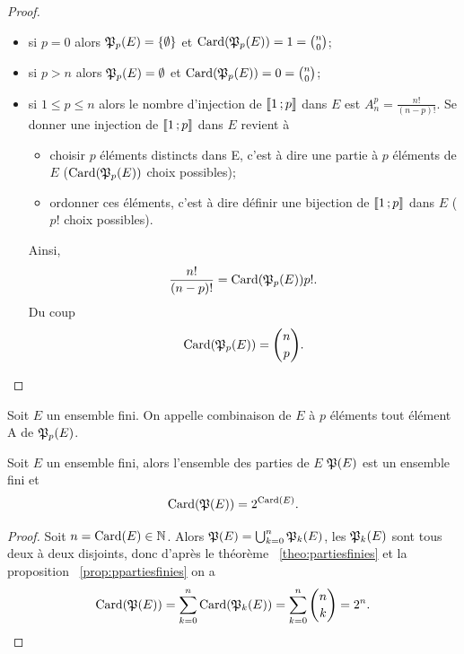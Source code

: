 \begin{proof}
  \begin{itemize}
    \item si \(p = 0\) alors \(\mathfrak{P}_p(E) = \{\emptyset\}\) et 
      \(\operatorname{Card}(\mathfrak{P}_p(E)) = 1 = \binom{n}{0}\);
    \item si \(p>n\) alors \(\mathfrak{P}_p(E)=\emptyset\) et 
      \(\operatorname{Card}(\mathfrak{P}_p(E)) = 0 = \binom{n}{0}\);
    \item si \(1\leqslant p \leqslant n\) alors le nombre d'injection de 
      \(\mathopen{\llbracket}1\mathclose{}\mathpunct{};p\mathclose{\rrbracket}\) dans \(E\) est \(A_{n}^p = \frac{n!}{(n - p)!}\).  
      Se donner une injection de  \(\mathopen{\llbracket}1\mathclose{}\mathpunct{};p\mathclose{\rrbracket}\) dans \(E\) revient 
      à
      \begin{itemize}
        \item choisir \(p\) éléments distincts dans E, c'est à dire une partie à 
          \(p\) éléments de \(E\) (\(\operatorname{Card}(\mathfrak{P}_p(E))\) choix possibles);
        \item ordonner ces éléments, c'est à dire définir une bijection de 
          \(\mathopen{\llbracket}1\mathclose{}\mathpunct{};p\mathclose{\rrbracket}\) dans \(E\) (\(p!\) choix possibles).
      \end{itemize}
      Ainsi,
      \begin{equation}
        \frac{n!}{(n - p)!}=\operatorname{Card}(\mathfrak{P}_p(E)) p!.
      \end{equation}
      Du coup
      \begin{equation}
        \operatorname{Card}(\mathfrak{P}_p(E)) = \binom{n}{p}.
      \end{equation}
  \end{itemize}
\end{proof}

\begin{defdef}
  Soit \(E\) un ensemble fini. On appelle combinaison de \(E\) à \(p\) éléments 
  tout élément A de \(\mathfrak{P}_p(E)\).
\end{defdef}

\begin{prop}
  Soit \(E\) un ensemble fini, alors l'ensemble des parties de \(E\) 
  \(\mathfrak{P}(E)\) est un ensemble fini et
  \begin{equation}
    \operatorname{Card}(\mathfrak{P}(E))=2^{\operatorname{Card}(E)}.
  \end{equation}
\end{prop}

\begin{proof}
  Soit \(n = \operatorname{Card}(E)\in \mathbb{N}\). Alors \(\mathfrak{P}(E)=\bigcup_{k = 0}^{n}\mathfrak{P}_k(E)\), les 
  \(\mathfrak{P}_k(E)\) sont tous deux à deux disjoints, donc d'après le théorème~
  \ref{theo:partiesfinies} et la proposition~
  \ref{prop:ppartiesfinies} on a
  \begin{equation}
    \operatorname{Card}(\mathfrak{P}(E))=\sum_{k = 0}^n \operatorname{Card}(\mathfrak{P}_k(E))=\sum_{k = 0}^n 
    \binom{n}{k}=2^n.
  \end{equation}
\end{proof}

